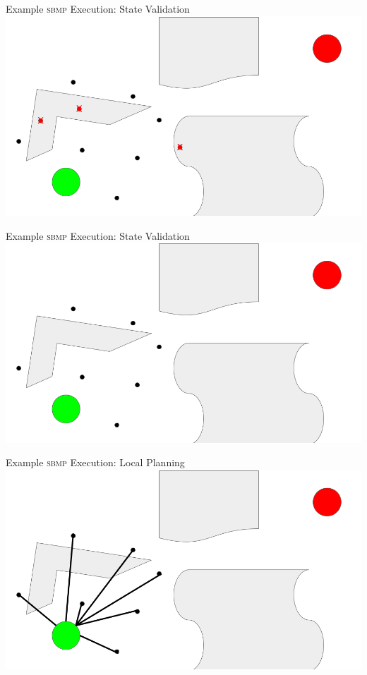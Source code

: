 \documentclass{beamer}
\begin{document}
\begin{frame}{Example \textsc{sbmp} Execution: State Validation}
\includegraphics[width=\textwidth]{./assets/rrt_slides/rrt_slides_3.25.png}
\end{frame}

\begin{frame}{Example \textsc{sbmp} Execution: State Validation}
\includegraphics[width=\textwidth]{./assets/rrt_slides/rrt_slides_3.5.png}
\end{frame}

\begin{frame}{Example \textsc{sbmp} Execution: Local Planning}
\includegraphics[width=\textwidth]{./assets/rrt_slides/rrt_slides_4.png}
\end{frame}
\end{document}
